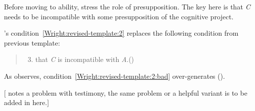 \documentclass[10pt]{article}
\begin{document}
\begin{note}
  Before moving to ability, stress the role of presupposition.
  The key here is that \emph{C} needs to be incompatible with some presupposition of the cognitive project.

  \citeauthor{Wright:2011wn}'s condition~\ref{Wright:revised-template:2} replaces the following condition from previous template:
  \begin{quote}
    \begin{enumerate}[label=(\roman*\(^{-}\)), ref=(\roman*\(^{-}\))]
      \setcounter{enumi}{2}
    \item\label{Wright:revised-template:2:bad} that \emph{C} is incompatible with \emph{A}.\hfill\mbox{(\citeyear[88]{Wright:2011wn})}
    \end{enumerate}
  \end{quote}
  As \citeauthor{Wright:2011wn} observes, condition~\ref{Wright:revised-template:2:bad} over-generates (\citeyear[90--92]{Wright:2011wn}).

  \begin{center}
    [\citeauthor{Wright:2011wn} notes a problem with testimony, the same problem or a helpful variant is to be added in here.]
  \end{center}
\end{note}
\end{document}
